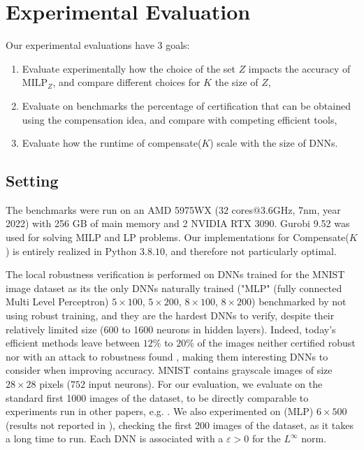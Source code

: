\documentclass{llncs}
\newcommand{\MILP}{{\textrm{MILP}}}
\begin{document}
\section{Experimental Evaluation}

Our experimental evaluations have 3 goals:
\begin{enumerate}
  \item Evaluate experimentally how the choice of the set $Z$ impacts the accuracy of $\MILP_Z$, and compare different choices for $K$ the size of $Z$,
  \item Evaluate on benchmarks the percentage of certification that can be obtained
 using the compensation idea, and compare with competing efficient tools,
  \item Evaluate how the runtime of compensate($K$) scale with the size of DNNs.
\end{enumerate}

\subsection{Setting}
The benchmarks were run on an AMD 5975WX ($32$ cores$@3.6$GHz, 7nm, year 2022) with 256 GB of main memory and 2 NVIDIA RTX 3090. Gurobi 9.52 was used for solving MILP and LP problems. Our implementations for Compensate($K$) is entirely realized in Python 
$3.8.10$, and therefore not particularly optimal.

The local robustness verification is performed on DNNs trained for the MNIST image dataset as its the only DNNs naturally trained ("MLP" (fully connected Multi Level Perceptron) $5\times 100$, $5\times 200$, $8 \times 100$, $8 \times 200$) benchmarked by \cite{crown} not using robust training, and they are the hardest DNNs to verify, despite their relatively limited size (600 to 1600 neurons in hidden layers). Indeed, today's efficient methods leave between $12\%$ to $20\%$ of the images neither certified robust \cite{crown} nor with an attack to robustness found \cite{attack}, making them interesting DNNs to consider when improving accuracy. MNIST contains grayscale images of size $28 \times 28$ pixels ($752$ input neurons). For our evaluation, we evaluate on the standard first 1000 images of the dataset, to be directly comparable to experiments run in other papers, e.g. \cite{prima,crown}. We also experimented on (MLP) $6\times 500$ (results not reported in \cite{prima,crown}), checking the first 200 images of the dataset, as it takes a long time to run. Each DNN is associated with a $\varepsilon>0$ for the $L^\infty$ norm.
\end{document}
